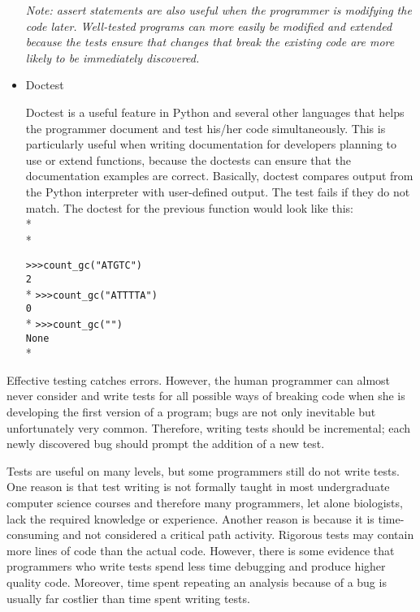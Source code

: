 \documentclass[ChapterTOCs,krantz2]{krantz} %
\begin{document}
\begin{itemize}
\textsl{Note: assert
statements are also useful 
when the programmer is modifying the code later.
Well-tested programs can more easily be modified and extended because the
tests ensure that changes that break the existing code are more likely to
be immediately discovered.}

\item Doctest

Doctest is a useful feature in Python and several other languages that helps the 
programmer document
and test his/her code simultaneously. This is particularly useful when writing
documentation for developers planning to use or extend functions, because
the doctests can ensure that the documentation examples are correct.
 Basically, doctest compares output
from the Python interpreter with user-defined output. The test fails if they do
not match. The doctest for the previous function would look like this:\\*\\*

\texttt{>>>count\_gc("ATGTC") \\2}\\*
\texttt{>>>count\_gc("ATTTTA") \\0}\\*
\texttt{>>>count\_gc("")\\None}\\*

\end{itemize}


Effective testing catches errors. However, the human programmer can almost
never consider and write tests for all possible ways of breaking code when
she is developing the first version of a program; bugs are not only inevitable
but unfortunately very common.
Therefore, writing tests should be incremental; each newly discovered bug
should prompt the addition of a new test.

Tests are useful on many levels, but some programmers still do not
write tests\cite{Wilson2006}.  One reason is that test writing is not formally taught in most
undergraduate computer science courses and therefore many programmers, let
alone biologists, lack the required knowledge or experience.  Another reason is
because it is time-consuming and not considered a critical path activity\cite{Segal2007,Kelly2008}.
Rigorous tests may contain more lines of code than the actual code. 
However, there is some evidence that
programmers who write tests 
spend less time debugging and produce higher quality code.
Moreover, time spent repeating an analysis because of a bug is usually far
costlier than time spent writing tests.
\end{document}
